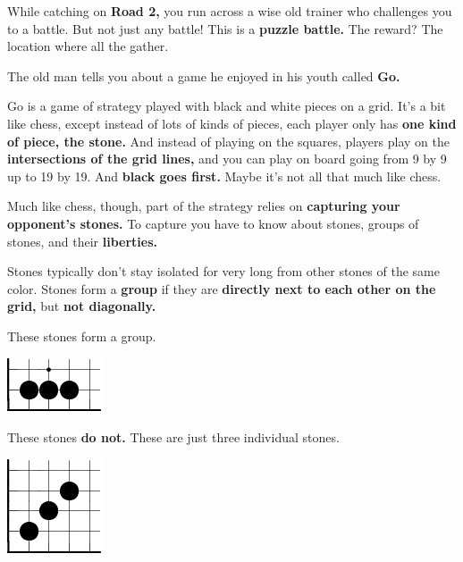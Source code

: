 

While catching \mappMobimon{} on \textbf{Road 2,} you run across a wise old
\mappMobimon{} trainer who challenges you to a \mappMobimon{} battle. But not
just any \mappMobimon{} battle! This is a \textbf{puzzle battle.} The reward?
The location where all the \mappMobimon{} gather.

The old man tells you about a game he enjoyed in his youth called \textbf{Go.}

Go is a game of strategy played with black and white pieces on a grid. It's a
bit like chess, except instead of lots of kinds of pieces, each player only has
\textbf{one kind of piece, the stone.} And instead of playing on the squares,
players play on the \textbf{intersections of the grid lines,} and you can play
on board going from 9 by 9 up to 19 by 19. And \textbf{black goes first.} Maybe
it's not all that much like chess.

Much like chess, though, part of the strategy relies on \textbf{capturing your
  opponent's stones.} To capture you have to know about stones, groups of
stones, and their \textbf{liberties.}

Stones typically don't stay isolated for very long from other stones of the same
color. Stones form a \textbf{group} if they are \textbf{directly next to each
  other on the grid,} but \textbf{not diagonally.}

These stones form a group.

\begin{center}
  \includegraphics{gogetem/assets/explanation1-crop}
\end{center}

These stones \textbf{do not.} These are just three individual stones.

\begin{center}
  \includegraphics{gogetem/assets/explanation2-crop}
\end{center}

